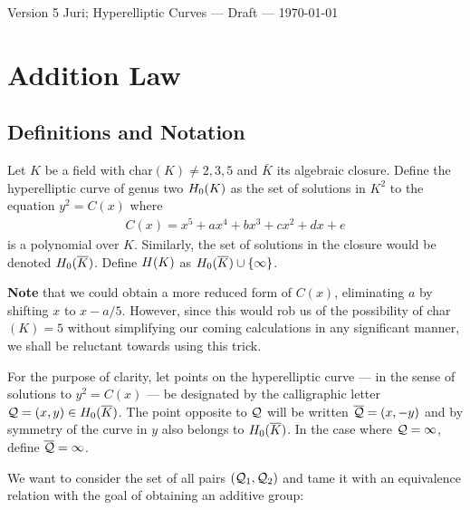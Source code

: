 \documentclass[english,11pt,a4paper]{article}
\begin{document}

Version 5 \scriptsize \hfill Juri; Hyperelliptic Curves --- Draft --- \today
\normalsize

\section{Addition Law}

\subsection{Definitions and Notation}

\begin{defin}
  Let $K$ be a field with char$(K) \neq 2, 3, 5$ and $\bar K$ its algebraic closure. Define the hyperelliptic curve of genus two $H_0(K)$ as the set of solutions in $K^2$ to the equation $y^2=C(x)$ where
  \begin{align*}
    C(x)=x^5+ax^4+bx^3+cx^2+dx+e
  \end{align*}
  is a polynomial over $K$. Similarly, the set of solutions in the closure would be denoted $H_0(\overline K)$.  Define $H(K)$ as $H_0(\overline K) \cup \{ \infty \}$.

  \textbf{Note} that we could obtain a more reduced form of $C(x)$, eliminating $a$ by shifting $x$ to $x-a/5$. However, since this would rob us of the possibility of char$(K) = 5$ without simplifying our coming calculations in any significant manner, we shall be reluctant towards using this trick.

  For the purpose of clarity, let points on the hyperelliptic curve --- in the sense of solutions to $y^2=C(x)$ --- be designated by the calligraphic letter $\mathcal{Q}=(x,y) \in H_0(\overline K)$. The point opposite to $\mathcal{Q}$ will be written $\overline {\mathcal{Q}} = (x,-y)$ and by symmetry of the curve in $y$ also belongs to $H_0(\overline K)$. In the case where $\mathcal{Q} = \infty$, define $\overline {\mathcal{Q}} = \infty$.

  We want to consider the set of all pairs $(\mathcal{Q}_1,\mathcal{Q}_2)$ and tame it with an equivalence relation with the goal of obtaining an additive group:
\end{defin}
\end{document}
